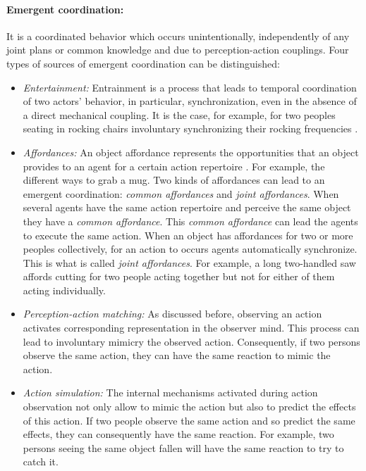 \documentclass[english,a4paper,11pt,twoside]{StyleThese}
\begin{document}
\paragraph{Emergent coordination:}
It is a coordinated behavior which occurs unintentionally, independently of any joint plans or common knowledge and due to perception-action couplings. Four types of sources of emergent coordination can be distinguished:
\begin{itemize}
\item \textit{Entertainment:} Entrainment is a process that leads to temporal coordination of two actors’ behavior, in particular, synchronization, even in the absence of a direct mechanical coupling. It is the case, for example, for two peoples seating in rocking chairs involuntary synchronizing their rocking frequencies \cite{richardson2007rocking}.
\item \textit{Affordances:} An object affordance represents the opportunities that an object provides to an agent for a certain action repertoire \cite{gibson2014theory}. For example, the different ways to grab a mug. Two kinds of affordances can lead to an emergent coordination: \textit{common affordances} and \textit{joint affordances}. When several agents have the same action repertoire and perceive the same object they have a \textit{common affordance}. This \textit{common affordance} can lead the agents to execute the same action. When an object has affordances for two or more peoples collectively, for an action to occurs agents automatically synchronize. This is what is called \textit{joint affordances}. For example, a long two-handled saw affords cutting for two people acting together but not for either of them acting individually.
\item \textit{Perception-action matching:} As discussed before, observing an action activates corresponding representation in the observer mind. This process can lead to involuntary mimicry the observed action. Consequently, if two persons observe the same action, they can have the same reaction to mimic the action.
\item \textit{Action simulation:} The internal mechanisms activated during action observation not only allow to mimic the action but also to predict the effects of this action. If two people observe the same action and so predict the same effects, they can consequently have the same reaction. For example, two persons seeing the same object fallen will have the same reaction to try to catch it.
\end{itemize}
\end{document}
